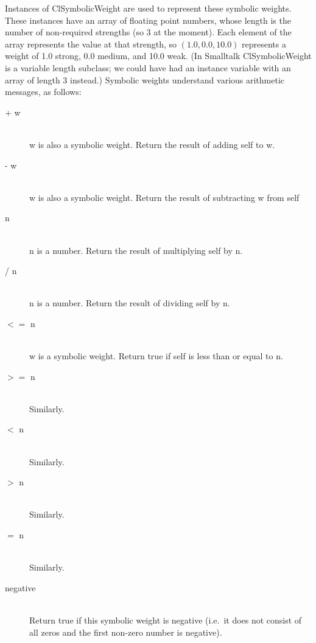 \documentclass{article}
\begin{document}
Instances of {\sf ClSymbolicWeight} are used to represent these symbolic
weights.  These instances have an array of floating point numbers, whose
length is the number of non-required strengths (so 3 at the moment).  Each
element of the array represents the value at that strength, so $(1.0, 0.0,
10.0)$ represents a weight of 1.0 {\sf strong}, 0.0 {\sf medium}, and 10.0
{\sf weak}.  (In Smalltalk {\sf ClSymbolicWeight} is a variable length
subclass; we could have had an instance variable with an array of length 3
instead.)   Symbolic weights understand various arithmetic messages, as
follows:

\begin{description}

\item[{\sf + w}]  \ \\
{\sf w} is also a symbolic weight.
Return the result of adding {\sf self} to {\sf w}.  

\item[{\sf - w}] \ \\
{\sf w} is also a symbolic weight.
Return the result of subtracting {\sf w} from {\sf self}

\item[{\sf * n}] \ \\
{\sf n} is a number.
Return the result of multiplying {\sf self} by {\sf n}.  

\item[{\sf / n}] \ \\
{\sf n} is a number.
Return the result of dividing {\sf self} by {\sf n}.  

\item[$<=$ {\sf  n}] \ \\
{\sf w} is a symbolic weight.
Return true if {\sf self} is less than or equal to {\sf n}.  

\item[$>=$ {\sf n}] \ \\
Similarly.

\item[$<$ {\sf n}] \ \\
Similarly.

\item[$>$ {\sf n}] \ \\
Similarly.

\item[$=$ {\sf n}] \ \\
Similarly.

\item[{\sf negative}] \ \\
Return true if this symbolic weight is negative
(i.e.\ it does not consist of all zeros and the first non-zero number is
negative). 

\end{description}
\end{document}
